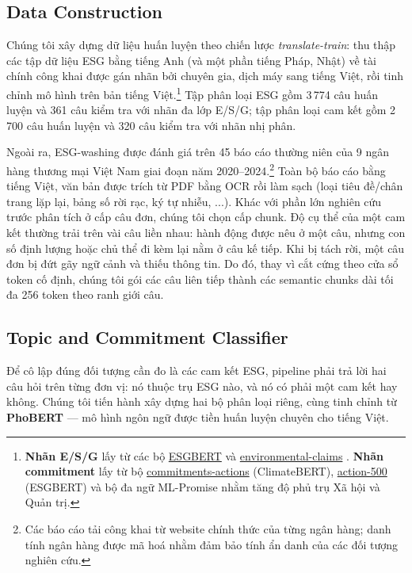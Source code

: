 \documentclass[runningheads]{llncs}
\begin{document}
\subsection{Data Construction}
Chúng tôi xây dựng dữ liệu huấn luyện theo chiến lược \emph{translate-train}: thu thập các tập dữ liệu ESG bằng tiếng Anh (và một phần tiếng Pháp, Nhật) về tài chính công khai được gán nhãn bởi chuyên gia, dịch máy sang tiếng Việt, rồi tinh chỉnh mô hình trên bản tiếng Việt.\footnote{\textbf{Nhãn E/S/G} lấy từ các bộ \href{https://huggingface.co/ESGBERT}{ESGBERT} \cite{esgbert} và \href{https://huggingface.co/datasets/climatebert/environmental_claims}{environmental-claims} \cite{webersinke2021climatebert}. \textbf{Nhãn commitment} lấy từ bộ \href{https://huggingface.co/datasets/climatebert/climate_commitments_actions}{commitments-actions} (ClimateBERT), \href{https://huggingface.co/ESGBERT}{action-500} (ESGBERT) và bộ đa ngữ ML-Promise \cite{seki-etal-2025-ml} nhằm tăng độ phủ trụ Xã hội và Quản trị.} Tập phân loại ESG gồm 3\,774 câu huấn luyện và 361 câu kiểm tra với nhãn đa lớp E/S/G; tập phân loại cam kết gồm 2\,700 câu huấn luyện và 320 câu kiểm tra với nhãn nhị phân.

Ngoài ra, ESG-washing được đánh giá trên 45 báo cáo thường niên của 9 ngân hàng thương mại Việt Nam giai đoạn năm 2020--2024.\footnote{Các báo cáo tải công khai từ website chính thức của từng ngân hàng; danh tính ngân hàng được mã hoá nhằm đảm bảo tính ẩn danh của các đối tượng nghiên cứu.} Toàn bộ báo cáo bằng tiếng Việt, văn bản được trích từ PDF bằng OCR rồi làm sạch (loại tiêu đề/chân trang lặp lại, bảng số rời rạc, ký tự nhiễu, ...). Khác với phần lớn nghiên cứu trước phân tích ở cấp câu đơn, chúng tôi chọn cấp chunk. Độ cụ thể của một cam kết thường trải trên vài câu liền nhau: hành động được nêu ở một câu, nhưng con số định lượng hoặc chủ thể đi kèm lại nằm ở câu kế tiếp. Khi bị tách rời, một câu đơn bị đứt gãy ngữ cảnh và thiếu thông tin. Do đó, thay vì cắt cứng theo cửa sổ token cố định, chúng tôi gói các câu liên tiếp thành các semantic chunks dài tối đa 256 token theo ranh giới câu.

\subsection{Topic and Commitment Classifier}
Để cô lập đúng đối tượng cần đo là các cam kết ESG, pipeline phải trả lời hai câu hỏi trên từng đơn vị: nó thuộc trụ ESG nào, và nó có phải một cam kết hay không. Chúng tôi tiến hành xây dựng hai bộ phân loại riêng, cùng tinh chỉnh từ \textbf{PhoBERT} \cite{nguyen2020phobert} --- mô hình ngôn ngữ được tiền huấn luyện chuyên cho tiếng Việt.
\end{document}
